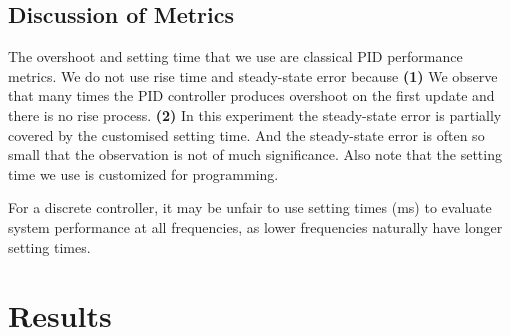 \documentclass[conference]{IEEEtran}
\begin{document}
\subsection{Discussion of Metrics}
\label{Metrics}

The overshoot and setting time that we use are classical PID performance metrics. We do not use rise time and steady-state error because \textbf{(1)} We observe that many times the PID controller produces overshoot on the first update and there is no rise process. \textbf{(2)} In this experiment the steady-state error is partially covered by the customised setting time. And the steady-state error is often so small that the observation is not of much significance. Also note that the setting time we use is customized for programming.

For a discrete controller, it may be unfair to use setting times (ms) to evaluate system performance at all frequencies, as lower frequencies naturally have longer setting times. 



\section{Results}
\label{Results}
\end{document}
